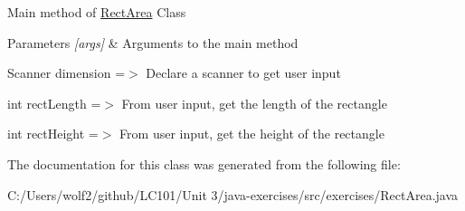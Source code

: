 Main method of \mbox{\hyperlink{classexercises_1_1_rect_area}{Rect\+Area}} Class 
\begin{DoxyParams}{Parameters}
{\em \mbox{[}args\mbox{]}} & Arguments to the main method \\
\hline
\end{DoxyParams}
Scanner dimension =$>$ Declare a scanner to get user input

int rect\+Length =$>$ From user input, get the length of the rectangle

int rect\+Height =$>$ From user input, get the height of the rectangle 

The documentation for this class was generated from the following file\+:\begin{DoxyCompactItemize}
\item 
C\+:/\+Users/wolf2/github/\+L\+C101/\+Unit 3/java-\/exercises/src/exercises/Rect\+Area.\+java\end{DoxyCompactItemize}
